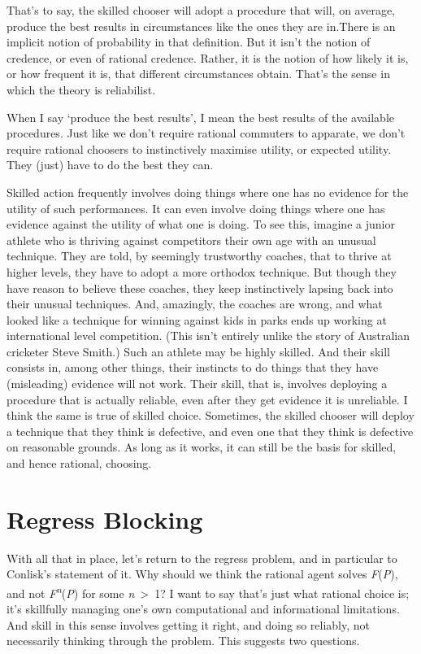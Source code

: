 \documentclass[
  11pt,
  letterpaper,
  DIV=11,
  numbers=noendperiod,
  twoside]{scrartcl}
\begin{document}
That's to say, the skilled chooser will adopt a procedure that will, on
average, produce the best results in circumstances like the ones they
are in.There is an implicit notion of probability in that definition.
But it isn't the notion of credence, or even of rational credence.
Rather, it is the notion of how likely it is, or how frequent it is,
that different circumstances obtain. That's the sense in which the
theory is reliabilist.

When I say `produce the best results', I mean the best results of the
available procedures. Just like we don't require rational commuters to
apparate, we don't require rational choosers to instinctively maximise
utility, or expected utility. They (just) have to do the best they can.

Skilled action frequently involves doing things where one has no
evidence for the utility of such performances. It can even involve doing
things where one has evidence against the utility of what one is doing.
To see this, imagine a junior athlete who is thriving against
competitors their own age with an unusual technique. They are told, by
seemingly trustworthy coaches, that to thrive at higher levels, they
have to adopt a more orthodox technique. But though they have reason to
believe these coaches, they keep instinctively lapsing back into their
unusual techniques. And, amazingly, the coaches are wrong, and what
looked like a technique for winning against kids in parks ends up
working at international level competition. (This isn't entirely unlike
the story of Australian cricketer Steve Smith.) Such an athlete may be
highly skilled. And their skill consists in, among other things, their
instincts to do things that they have (misleading) evidence will not
work. Their skill, that is, involves deploying a procedure that is
actually reliable, even after they get evidence it is unreliable. I
think the same is true of skilled choice. Sometimes, the skilled chooser
will deploy a technique that they think is defective, and even one that
they think is defective on reasonable grounds. As long as it works, it
can still be the basis for skilled, and hence rational, choosing.

\section{Regress Blocking}\label{regress-blocking}

With all that in place, let's return to the regress problem, and in
particular to Conlisk's statement of it. Why should we think the
rational agent solves \emph{F}(\emph{P}), and not
\emph{F\textsuperscript{n}}(\emph{P}) for some \emph{n}~\textgreater~1?
I want to say that's just what rational choice is; it's skillfully
managing one's own computational and informational limitations. And
skill in this sense involves getting it right, and doing so reliably,
not necessarily thinking through the problem. This suggests two
questions.
\end{document}

